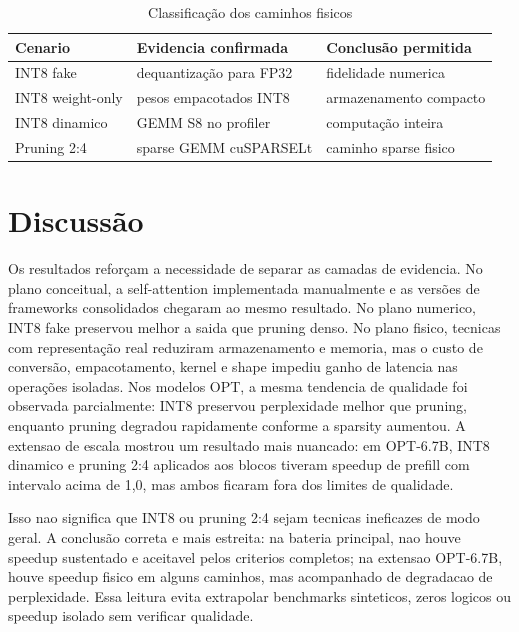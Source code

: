 \documentclass[12pt, a4paper]{article}
\begin{document}
\begin{table}[H]
\centering
\caption{Classifica\c{c}\~ao dos caminhos fisicos}
\begin{tabular}{lll}
\toprule
\textbf{Cenario} & \textbf{Evidencia confirmada} & \textbf{Conclus\~ao permitida} \\
\midrule
INT8 fake & dequantiza\c{c}\~ao para FP32 & fidelidade numerica \\
INT8 weight-only & pesos empacotados INT8 & armazenamento compacto \\
INT8 dinamico & GEMM S8 no profiler & computa\c{c}\~ao inteira \\
Pruning 2:4 & sparse GEMM cuSPARSELt & caminho sparse fisico \\
\bottomrule
\end{tabular}
\end{table}

\section{Discuss\~ao}

Os resultados refor\c{c}am a necessidade de separar as camadas de evidencia. No
plano conceitual, a self-attention implementada manualmente e as vers\~oes de
frameworks consolidados chegaram ao mesmo resultado. No plano numerico, INT8
fake preservou melhor a saida que pruning denso. No plano fisico, tecnicas com
representa\c{c}\~ao real reduziram armazenamento e memoria, mas o custo de
convers\~ao, empacotamento, kernel e shape impediu ganho de latencia nas
opera\c{c}\~oes isoladas. Nos modelos OPT, a mesma tendencia de qualidade foi
observada parcialmente: INT8 preservou perplexidade melhor que pruning, enquanto
pruning degradou rapidamente conforme a sparsity aumentou. A extensao de escala
mostrou um resultado mais nuancado: em OPT-6.7B, INT8 dinamico e pruning 2:4
aplicados aos blocos tiveram speedup de prefill com intervalo acima de 1,0, mas
ambos ficaram fora dos limites de qualidade.

Isso nao significa que INT8 ou pruning 2:4 sejam tecnicas ineficazes de modo
geral. A conclus\~ao correta e mais estreita: na bateria principal, nao houve
speedup sustentado e aceitavel pelos criterios completos; na extensao OPT-6.7B,
houve speedup fisico em alguns caminhos, mas acompanhado de degradacao de
perplexidade. Essa leitura evita extrapolar benchmarks sinteticos, zeros
logicos ou speedup isolado sem verificar qualidade.
\end{document}

